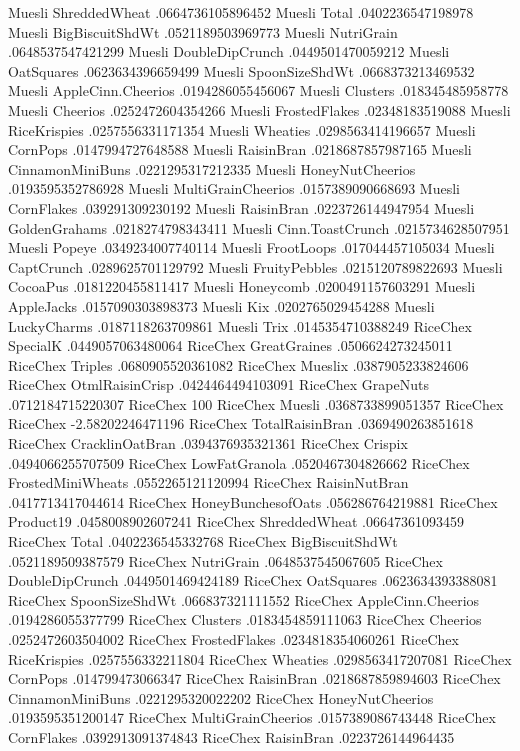 Muesli	ShreddedWheat	.0664736105896452
Muesli	Total	.0402236547198978
Muesli	BigBiscuitShdWt	.0521189503969773
Muesli	NutriGrain	.0648537547421299
Muesli	DoubleDipCrunch	.0449501470059212
Muesli	OatSquares	.0623634396659499
Muesli	SpoonSizeShdWt	.0668373213469532
Muesli	AppleCinn.Cheerios	.0194286055456067
Muesli	Clusters	.018345485958778
Muesli	Cheerios	.0252472604354266
Muesli	FrostedFlakes	.02348183519088
Muesli	RiceKrispies	.0257556331171354
Muesli	Wheaties	.0298563414196657
Muesli	CornPops	.0147994727648588
Muesli	RaisinBran	.0218687857987165
Muesli	CinnamonMiniBuns	.0221295317212335
Muesli	HoneyNutCheerios	.0193595352786928
Muesli	MultiGrainCheerios	.0157389090668693
Muesli	CornFlakes	.039291309230192
Muesli	RaisinBran	.0223726144947954
Muesli	GoldenGrahams	.0218274798343411
Muesli	Cinn.ToastCrunch	.0215734628507951
Muesli	Popeye	.0349234007740114
Muesli	FrootLoops	.017044457105034
Muesli	CaptCrunch	.0289625701129792
Muesli	FruityPebbles	.0215120789822693
Muesli	CocoaPus	.0181220455811417
Muesli	Honeycomb	.0200491157603291
Muesli	AppleJacks	.0157090303898373
Muesli	Kix	.0202765029454288
Muesli	LuckyCharms	.0187118263709861
Muesli	Trix	.0145354710388249
RiceChex	SpecialK	.0449057063480064
RiceChex	GreatGraines	.0506624273245011
RiceChex	Triples	.0680905520361082
RiceChex	Mueslix	.0387905233824606
RiceChex	OtmlRaisinCrisp	.0424464494103091
RiceChex	GrapeNuts	.0712184715220307
RiceChex	100%
RiceChex	Muesli	.0368733899051357
RiceChex	RiceChex	-2.58202246471196
RiceChex	TotalRaisinBran	.0369490263851618
RiceChex	CracklinOatBran	.0394376935321361
RiceChex	Crispix	.0494066255707509
RiceChex	LowFatGranola	.0520467304826662
RiceChex	FrostedMiniWheats	.0552265121120994
RiceChex	RaisinNutBran	.0417713417044614
RiceChex	HoneyBunchesofOats	.056286764219881
RiceChex	Product19	.0458008902607241
RiceChex	ShreddedWheat	.06647361093459
RiceChex	Total	.0402236545332768
RiceChex	BigBiscuitShdWt	.0521189509387579
RiceChex	NutriGrain	.0648537545067605
RiceChex	DoubleDipCrunch	.0449501469424189
RiceChex	OatSquares	.0623634393388081
RiceChex	SpoonSizeShdWt	.066837321111552
RiceChex	AppleCinn.Cheerios	.0194286055377799
RiceChex	Clusters	.0183454859111063
RiceChex	Cheerios	.0252472603504002
RiceChex	FrostedFlakes	.0234818354060261
RiceChex	RiceKrispies	.0257556332211804
RiceChex	Wheaties	.0298563417207081
RiceChex	CornPops	.014799473066347
RiceChex	RaisinBran	.0218687859894603
RiceChex	CinnamonMiniBuns	.0221295320022202
RiceChex	HoneyNutCheerios	.0193595351200147
RiceChex	MultiGrainCheerios	.0157389086743448
RiceChex	CornFlakes	.0392913091374843
RiceChex	RaisinBran	.0223726144964435
